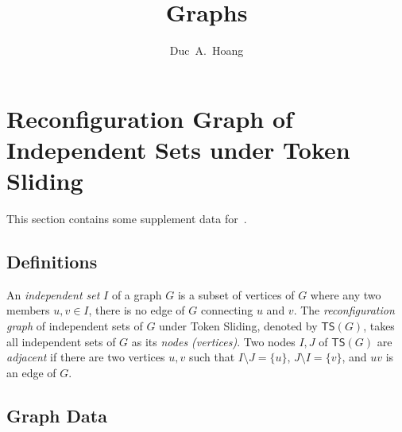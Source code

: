 \documentclass[a4paper]{article}
\title{}
\author{}
\title{Graphs}
\author{Duc~A.~Hoang}
\theoremstyle{definition}
\theoremstyle{remark}
\numberwithin{equation}{section}
\begin{document}
\nocite{*}

\maketitle

%

\tableofcontents

\section{Reconfiguration Graph of Independent Sets under Token Sliding}

This section contains some supplement data for~\cite{AvisH22}.

\subsection{Definitions}

An \textit{independent set} $I$ of a graph $G$ is a subset of vertices of $G$ where any two members $u, v \in I$, there is no edge of $G$ connecting $u$ and $v$.
The \textit{reconfiguration graph} of independent sets of $G$ under Token Sliding, denoted by $\mathsf{TS}(G)$, takes all independent sets of $G$ as its \textit{nodes (vertices)}.
Two nodes $I, J$ of $\mathsf{TS}(G)$ are \textit{adjacent} if there are two vertices $u, v$ such that $I \setminus J = \{u\}$, $J \setminus I = \{v\}$, and $uv$ is an edge of $G$.

\subsection{Graph Data}
\end{document}
